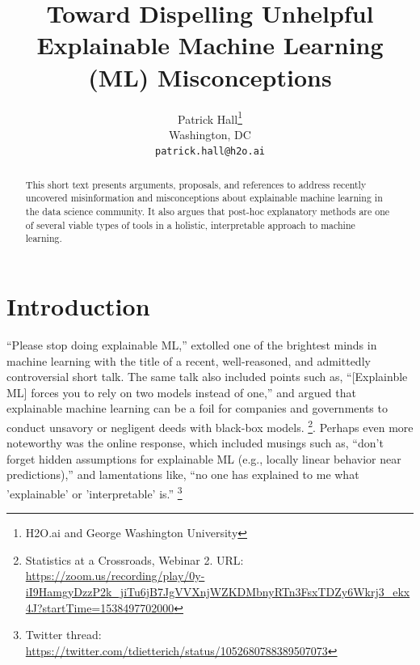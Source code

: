 \documentclass{article}
\title{Toward Dispelling Unhelpful Explainable Machine Learning (ML) Misconceptions}
\author{
  Patrick Hall\thanks{H2O.ai and George Washington University}\\
  Washington, DC\\
  \texttt{patrick.hall@h2o.ai}}
\begin{document}
\maketitle

\begin{abstract}

This short text presents arguments, proposals, and references to address recently uncovered misinformation and misconceptions about explainable machine learning in the data science community. It also argues that post-hoc explanatory methods are one of several viable types of tools in a holistic, interpretable approach to machine learning.

\end{abstract}

\section{Introduction}

``Please stop doing explainable ML,'' extolled one of the brightest minds in machine learning with the title of a recent, well-reasoned, and admittedly controversial short talk. The same talk also included points such as, ``[Explainble ML] forces you to rely on two models instead of one,'' and argued that explainable machine learning can be a foil for companies and governments to conduct unsavory or negligent deeds with black-box models. \footnote{Statistics at a Crossroads, Webinar 2. URL: \url{https://zoom.us/recording/play/0y-iI9HamgyDzzP2k_jiTu6jB7JgVVXnjWZKDMbnyRTn3FsxTDZy6Wkrj3_ekx4J?startTime=1538497702000}}. Perhaps even more noteworthy was the online response, which included musings such as, ``don’t forget hidden assumptions for explainable ML (e.g., locally linear behavior near predictions),'' and lamentations like, ``no one has explained to me what 'explainable' or 'interpretable' is.'' \footnote{Twitter thread: \url{https://twitter.com/tdietterich/status/1052680788389507073}}  
\end{document}
